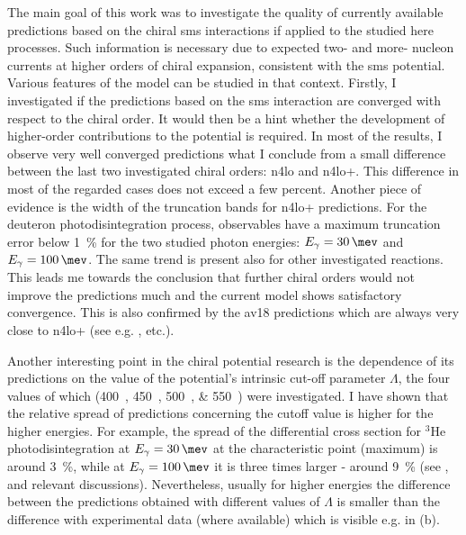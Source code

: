 The main goal of this work was to investigate the quality of currently available
predictions based on the chiral \gls{sms}
interactions if applied to the studied here processes.
Such information is necessary due to expected two- and more- nucleon currents
at higher orders of chiral expansion, consistent with the \gls{sms} potential.
Various features of the model can be studied in that context.
Firstly, I investigated if the predictions based on the \gls{sms} interaction
are converged with respect to the chiral order.
It would then be a hint whether the development of higher-order contributions to the potential is required.
In most of the results, I observe very well converged predictions what I conclude from a small difference
between the last two investigated chiral orders: \gls{n4lo} and \gls{n4lo+}. This
difference in most of the regarded cases does not exceed a few percent.
Another piece of evidence is the width of the truncation bands for \gls{n4lo+} predictions.
For the deuteron photodisintegration process, observables have a maximum
truncation error below \SI{1}{\percent} for the two studied photon energies:
$E_\gamma=\SI{30}{\mev}$ and $E_\gamma=\SI{100}{\mev}$.
The same trend is present also for other investigated reactions.
This leads me towards the conclusion that further chiral orders would not
improve the predictions much and the current model shows satisfactory convergence.
This is also confirmed by the \gls{av18} predictions which are
always very close to \gls{n4lo+} (see e.g. ,  etc.).

Another interesting point in the chiral potential research is the dependence of its predictions
on the value of the potential's intrinsic cut-off parameter $\Lambda$, the four values of which (\SIlist[list-units = single]{400;450;500;550}{\mev}) 
were investigated. I have shown that the relative spread of predictions 
concerning the cutoff value is higher for the higher energies.
For example, the spread of the differential cross section for $^3$He photodisintegration
at $E_\gamma=\SI{30}{\mev}$ at the characteristic point (maximum) is around \SI{3}{\percent},
while at $E_\gamma=\SI{100}{\mev}$ it is three times larger - around \SI{9}{\percent}
(see ,  and relevant discussions).
Nevertheless, usually for higher energies the difference between the predictions
obtained with different values of $\Lambda$ is smaller than the difference with experimental
data (where available) which is visible e.g. in (b).

